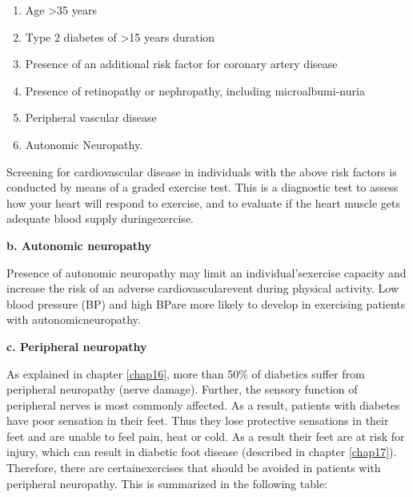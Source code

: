 \vspace{-\topsep}
\begin{enumerate}[•]
\itemsep=0pt
\item Age \textgreater  35 years
\item Type 2 diabetes of \textgreater  15 years duration
\item Presence of an additional risk factor for coronary artery disease
\item Presence of retinopathy or nephropathy, including microalbumi-\break nuria
\item Peripheral vascular disease
\item Autonomic Neuropathy.
\end{enumerate}
\vspace{-\topsep}

Screening for cardiovascular disease in individuals with the above risk factors is conducted by means of a graded exercise test. This is a dia\-gnostic test to assess how your heart will respond to exercise, and to evaluate if the heart muscle gets adequate blood supply during\break exercise.

\noindent\textbf{b. Autonomic neuropathy}

Presence of autonomic neuropathy may limit an individual’s\break exercise capacity and increase the risk of an adverse cardiovascular\break event during physical activity. Low blood pressure (BP) and high BP\break are more likely to develop in exercising patients with autonomic\break neuropathy.

\clearpage

\noindent\textbf{c. Peripheral neuropathy}

As explained in chapter \ref{chap16}, more than 50\% of diabetics suffer from peripheral neuropathy (nerve damage). Further, the sensory function of peripheral nerves is most commonly affected. As a result, patients with diabetes have poor sensation in their feet. Thus they lose prote\-ctive sensations in their feet and are unable to feel pain, heat or cold. As a result their feet are at risk for injury, which can result in diabetic foot disease (described in chapter \ref{chap17}). Therefore, there are certain\break exercises that should be avoided in patients with peripheral neuro\-pathy. This is summarized in the following table:

